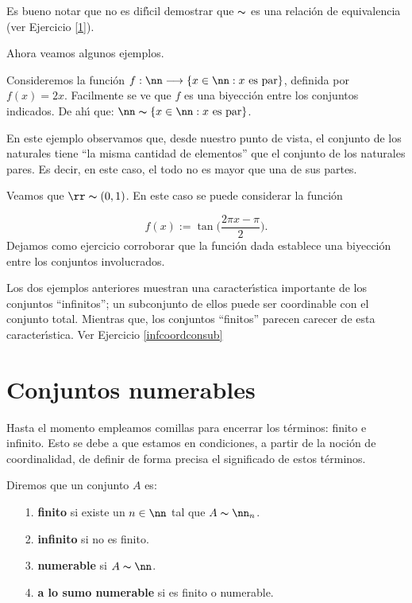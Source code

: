 Es bueno notar que no es dif\'{\i}cil demostrar que $\thicksim$ es
una relaci\'on de equivalencia (ver Ejercicio \vref{1}).

 Ahora
veamos algunos ejemplos.

\begin{ejemplo}Consideremos la funci\'on
$f:\nn\longrightarrow\{x\in\nn:x\,\,\text{es par}\}$, definida por
$f(x)=2x$. Facilmente se ve que $f$ es una biyecci\'on entre los
conjuntos indicados. De ah\'{\i} que:
$\nn\thicksim\{x\in\nn:x\,\,\text{es par}\}$.
\end{ejemplo}

En este ejemplo observamos que, desde nuestro punto de vista, el
conjunto de los naturales tiene ``la misma cantidad de elementos''
que el conjunto de los naturales pares. Es decir, en este caso, el
todo no es mayor que una de sus partes.

\begin{ejemplo}\label{rcoord(0,1)} Veamos que $\rr\thicksim (0,1)$. En este caso se
puede considerar la funci\'on

\[f(x):= \tan\biggl(\frac{2\pi x-\pi}{2}\biggr).\]
Dejamos como ejercicio corroborar que la funci\'on dada establece
una biyecci\'on entre los conjuntos involucrados.
\end{ejemplo}

Los dos ejemplos anteriores muestran una caracter\'{\i}stica
importante de los conjuntos ``infinitos''; un subconjunto de ellos
puede ser coordinable con el conjunto total. Mientras que, los
conjuntos ``finitos'' parecen carecer de esta caracter\'{\i}stica.
Ver Ejercicio \vref{infcoordconsub}





\section{Conjuntos numerables}
Hasta el momento empleamos comillas para encerrar los t\'erminos:
finito e infinito. Esto se debe a que estamos en condiciones, a
partir de la noci\'on  de coordinalidad, de definir de forma
precisa el significado de estos t\'erminos.

\begin{definicion} Diremos que un conjunto $A$ es:
\begin{itemize}
\item[1.] \textbf{finito} si existe un $n\in\nn$ tal que
$A\thicksim\nn_n$.
\item[2.] \textbf{infinito }si no es finito.
\item[3.] \textbf{numerable} si $A\thicksim\nn$.
\item[4.] \textbf{a lo sumo numerable} si es finito o numerable.
\end{itemize}
\end{definicion}


